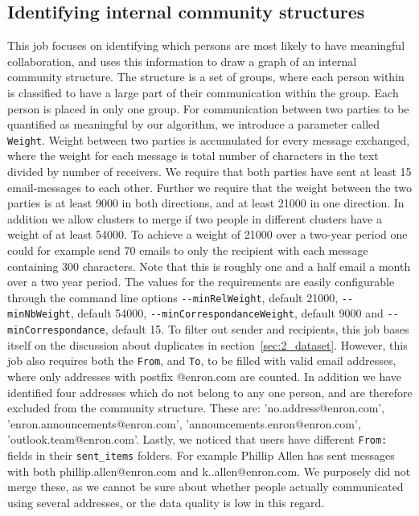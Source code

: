\documentclass[runningheads,a4paper]{llncs}
\begin{document}
\subsection{Identifying internal community structures}
\label{sec:comstruct}
This job focuses on identifying which persons are most likely to have meaningful collaboration, and uses this information to draw a graph of an internal community structure. The structure is a set of groups, where each person within is classified to have a large part of their communication within the group. Each person is placed in only one group.
\newline
\newline
For communication between two parties to be quantified as meaningful by our algorithm, we introduce a parameter called \verb!Weight!. Weight between two parties is accumulated for every message exchanged, where the weight for each message is total number of characters in the text divided by number of receivers. We require that both parties have sent at least 15 email-messages to each other. Further we require that the weight between the two parties is at least 9000 in both directions, and at least 21000 in one direction. In addition we allow clusters to merge if two people in different clusters have a weight of at least 54000. To achieve a weight of 21000 over a two-year period one could for example send 70 emails to only the recipient with each message containing 300 characters. Note that this is roughly one and a half email a month over a two year period. The values for the requirements are easily configurable through the command line options \verb!--minRelWeight!, default 21000, \verb!--minNbWeight!, default 54000, \verb!--minCorrespondanceWeight!, default 9000 and \verb!--minCorrespondance!, default 15.
\newline
\newline
To filter out sender and recipients, this job bases itself on the discussion about duplicates in section~\ref{sec:2_dataset}. However, this job also requires both the \verb!From!, and \verb!To!, to be filled with valid email addresses, where only addresses with postfix @enron.com are counted. In addition we have identified four addresses which do not belong to any one person, and are therefore excluded from the community structure. These are: 'no.address@enron.com', 'enron.announcements@enron.com', 'announcements.enron@enron.com', 'outlook.team@enron.com'. Lastly, we noticed that users have different \verb!From:! fields in their \verb!sent_items! folders. For example Phillip Allen has sent messages with both phillip.allen@enron.com and k..allen@enron.com. We purposely did not merge these, as we cannot be sure about whether people actually communicated using several addresses, or the data quality is low in this regard.
\end{document}
